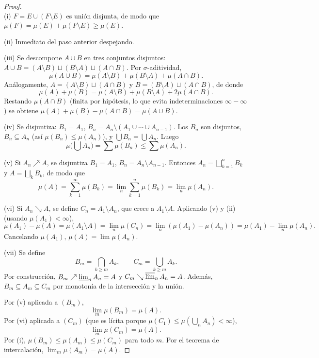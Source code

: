 \documentclass[11pt, a4paper]{article}
\begin{document}
\begin{proof}\leavevmode\\
(i) $F = E \cup (F \setminus E)$ es unión disjunta, de modo que
$\mu(F) = \mu(E) + \mu(F \setminus E)
\ge \mu(E)$.

(ii) Inmediato del paso anterior despejando.

(iii) Se descompone $A \cup B$ en tres conjuntos disjuntos: $A \cup B = (A \setminus B) \sqcup
(B \setminus A) \sqcup (A \cap B)$. Por $\sigma$-aditividad,
$$ \mu(A \cup B) = \mu(A \setminus B) + \mu(B \setminus A) + \mu(A \cap B). $$
Análogamente, $A = (A \setminus B) \sqcup (A \cap B)$ y $B = (B \setminus A) \sqcup
(A \cap B)$, de donde
$$ \mu(A) + \mu(B) = \mu(A \setminus B) + \mu(B \setminus A) + 2 \mu(A \cap B). $$
Restando $\mu(A \cap B)$ (finita por hipótesis, lo que evita indeterminaciones $\infty - \infty$)
se obtiene $\mu(A) + \mu(B) - \mu(A \cap B) = \mu(A \cup B)$.

(iv) Se disjuntiza: $B_1 = A_1$, $B_n = A_n \setminus (A_1 \cup \cdots \cup A_{n-1})$. Los $B_n$ son
disjuntos, $B_n \subseteq A_n$ (así $\mu(B_n) \le \mu(A_n)$), y $\bigcup B_n = \bigcup A_n$. Luego
$$ \mu\!\Big(\!\bigcup A_n\Big) = \sum \mu(B_n) \le \sum \mu(A_n). $$

(v) Si $A_n \nearrow A$, se disjuntiza $B_1 = A_1$, $B_n = A_n \setminus A_{n-1}$.
Entonces $A_n = \bigsqcup_{k=1}^n B_k$ y $A = \bigsqcup_k B_k$, de modo que
$$ \mu(A) = \sum_{k=1}^\infty \mu(B_k) = \lim_n \sum_{k=1}^n \mu(B_k) = \lim_n \mu(A_n). $$

(vi) Si $A_n \searrow A$, se define $C_n = A_1 \setminus A_n$, que crece a $A_1 \setminus A$.
Aplicando (v) y (ii) (usando $\mu(A_1) < \infty$),
$$ \mu(A_1) - \mu(A) = \mu(A_1 \setminus A) = \lim_n \mu(C_n) = \lim_n (\mu(A_1) - \mu(A_n)) =
\mu(A_1) - \lim_n \mu(A_n). $$
Cancelando $\mu(A_1)$, $\mu(A) = \lim \mu(A_n)$.

(vii) Se define
$$ B_m = \bigcap_{k \ge m} A_k, \qquad C_m = \bigcup_{k \ge m} A_k. $$
Por construcción, $B_m \nearrow \varliminf_n A_n = A$ y $C_m \searrow \varlimsup_n A_n = A$.
Además, $B_m \subseteq A_m \subseteq C_m$ por monotonía de la intersección y la unión.

Por (v) aplicada a $(B_m)$,
$$ \lim_m \mu(B_m) = \mu(A). $$
Por (vi) aplicada a $(C_m)$ (que es lícita porque $\mu(C_1) \le \mu(\bigcup_n A_n) < \infty$),
$$ \lim_m \mu(C_m) = \mu(A). $$
Por (i), $\mu(B_m) \le \mu(A_m) \le \mu(C_m)$ para todo $m$. Por el teorema de
intercalación, $\lim_m \mu(A_m) = \mu(A)$.
\end{proof}
\end{document}

